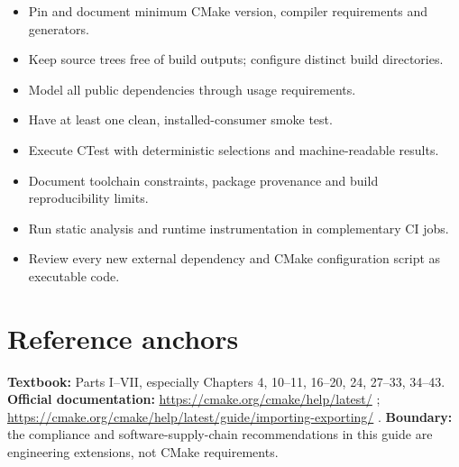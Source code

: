 \documentclass[11pt,letterpaper,oneside]{report}
\providecommand{\tightlist}{\setlength{\itemsep}{0pt}\setlength{\parskip}{0pt}}
\begin{document}
\begin{itemize}
\tightlist
\item[$\square$]
  Pin and document minimum CMake version, compiler requirements and
  generators.
\item[$\square$]
  Keep source trees free of build outputs; configure distinct build
  directories.
\item[$\square$]
  Model all public dependencies through usage requirements.
\item[$\square$]
  Have at least one clean, installed-consumer smoke test.
\item[$\square$]
  Execute CTest with deterministic selections and machine-readable
  results.
\item[$\square$]
  Document toolchain constraints, package provenance and build
  reproducibility limits.
\item[$\square$]
  Run static analysis and runtime instrumentation in complementary CI
  jobs.
\item[$\square$]
  Review every new external dependency and CMake configuration script as
  executable code.
\end{itemize}

\chapter{Reference anchors}\label{reference-anchors}

\textbf{Textbook:} Parts I--VII, especially Chapters 4, 10--11, 16--20,
24, 27--33, 34--43. \textbf{Official documentation:}
\url{https://cmake.org/cmake/help/latest/} ;
\url{https://cmake.org/cmake/help/latest/guide/importing-exporting/} .
\textbf{Boundary:} the compliance and software-supply-chain
recommendations in this guide are engineering extensions, not CMake
requirements.
\end{document}
